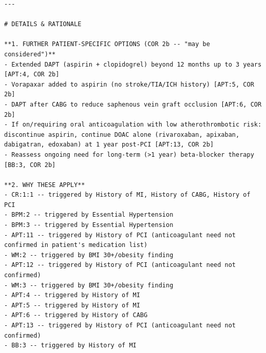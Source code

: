 \begin{lstlisting}
---

# DETAILS & RATIONALE

**1. FURTHER PATIENT-SPECIFIC OPTIONS (COR 2b -- "may be considered")**
- Extended DAPT (aspirin + clopidogrel) beyond 12 months up to 3 years [APT:4, COR 2b]
- Vorapaxar added to aspirin (no stroke/TIA/ICH history) [APT:5, COR 2b]
- DAPT after CABG to reduce saphenous vein graft occlusion [APT:6, COR 2b]
- If on/requiring oral anticoagulation with low atherothrombotic risk: discontinue aspirin, continue DOAC alone (rivaroxaban, apixaban, dabigatran, edoxaban) at 1 year post-PCI [APT:13, COR 2b]
- Reassess ongoing need for long-term (>1 year) beta-blocker therapy [BB:3, COR 2b]

**2. WHY THESE APPLY**
- CR:1:1 -- triggered by History of MI, History of CABG, History of PCI
- BPM:2 -- triggered by Essential Hypertension
- BPM:3 -- triggered by Essential Hypertension
- APT:11 -- triggered by History of PCI (anticoagulant need not confirmed in patient's medication list)
- WM:2 -- triggered by BMI 30+/obesity finding
- APT:12 -- triggered by History of PCI (anticoagulant need not confirmed)
- WM:3 -- triggered by BMI 30+/obesity finding
- APT:4 -- triggered by History of MI
- APT:5 -- triggered by History of MI
- APT:6 -- triggered by History of CABG
- APT:13 -- triggered by History of PCI (anticoagulant need not confirmed)
- BB:3 -- triggered by History of MI


\end{lstlisting}
